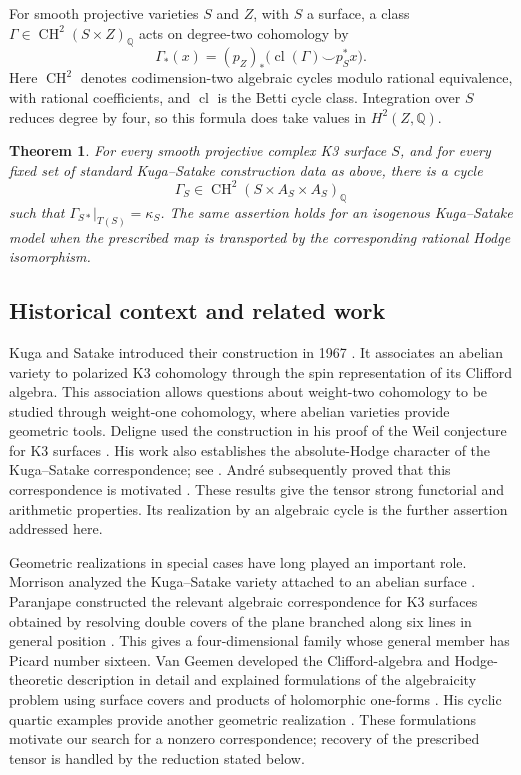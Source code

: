 \documentclass[11pt]{article}
\numberwithin{equation}{section}
\newtheorem{theorem}{Theorem}[section]
\theoremstyle{definition}
\theoremstyle{remark}
\newcommand{\Q}{\mathbb Q}
\newcommand{\CH}{\operatorname{CH}}
\newcommand{\cl}{\operatorname{cl}}
\begin{document}
For smooth projective varieties $S$ and $Z$, with $S$ a surface, a
class $\Gamma\in\CH^2(S\times Z)_\Q$ acts on degree-two cohomology
by
\[
 \Gamma_*(x)=(p_Z)_*\bigl(\cl(\Gamma)\smile p_S^*x\bigr).
\]
Here $\CH^2$ denotes codimension-two algebraic cycles modulo rational
equivalence, with rational coefficients, and $\cl$ is the Betti cycle
class.  Integration over $S$ reduces degree by four, so this formula
does take values in $H^2(Z,\Q)$.

\begin{theorem}
\label{thm:main}
For every smooth projective complex K3 surface $S$, and for every
fixed set of standard Kuga--Satake construction data as above, there
is a cycle
\[
             \Gamma_S\in\CH^2(S\times A_S\times A_S)_\Q
\]
such that $\Gamma_{S*}|_{T(S)}=\kappa_S$.
The same assertion holds for an isogenous Kuga--Satake model when
the prescribed map is transported by the corresponding rational
Hodge isomorphism.
\end{theorem}


\subsection{Historical context and related work}

Kuga and Satake introduced their construction in 1967
\cite{History:KugaSatake}.  It associates an abelian variety to
polarized K3 cohomology through the spin representation of its
Clifford algebra.  This association allows questions about
weight-two cohomology to be studied through weight-one cohomology,
where abelian varieties provide geometric tools.  Deligne used
the construction in his proof of the Weil conjecture for K3
surfaces \cite{History:DeligneK3}.  His work also establishes the
absolute-Hodge character of the Kuga--Satake correspondence;
see \cite{History:DeligneK3,History:DeligneHodge}.
Andr\'e subsequently proved that this correspondence is motivated
\cite[Section~7]{History:Andre}.  These results give the tensor
strong functorial and arithmetic properties.  Its realization by
an algebraic cycle is the further assertion addressed here.

Geometric realizations in special cases have long played an
important role.  Morrison analyzed the Kuga--Satake variety
attached to an abelian surface \cite{History:Morrison}.
Paranjape constructed the relevant algebraic correspondence for
K3 surfaces obtained by resolving double covers of the plane
branched along six lines in general position
\cite{History:Paranjape}.  This gives a four-dimensional family
whose general member has Picard number sixteen.  Van Geemen
developed the Clifford-algebra and Hodge-theoretic description
in detail and explained formulations of the algebraicity problem
using surface covers and products of holomorphic one-forms
\cite[Sections~10--11]{History:VanGeemen}.  His cyclic quartic
examples provide another geometric realization
\cite[Example~11.3]{History:VanGeemen}.  These formulations
motivate our search for a nonzero correspondence; recovery of
the prescribed tensor is handled by the reduction stated below.
\end{document}
